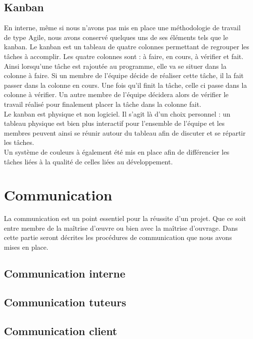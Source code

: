 \documentclass[asi]{picInsa}
\begin{document}
\subsection{Kanban}
En interne, même si nous n'avons pas mis en place une méthodologie de travail de type Agile, nous avons conservé quelques uns de ses éléments tels que le kanban. Le kanban est un tableau de quatre colonnes permettant de regrouper les tâches à accomplir. Les quatre colonnes sont : à faire, en cours, à vérifier et fait. Ainsi lorsqu'une tâche est rajoutée au programme, elle va se situer dans la colonne à faire. Si un membre de l'équipe décide de réaliser cette tâche, il la fait passer dans la colonne en cours. Une fois qu'il finit la tâche, celle ci passe dans la colonne à vérifier. Un autre membre de l'équipe décidera alors de vérifier le travail réalisé pour finalement placer la tâche dans la colonne fait.\\
Le kanban est physique et non logiciel. Il s'agit là d'un choix personnel : un tableau physique est bien plus interactif pour l'ensemble de l'équipe et les membres peuvent ainsi se réunir autour du tableau afin de discuter et se répartir les tâches.\\
Un système de couleurs à également été mis en place afin de différencier les tâches liées à la qualité de celles liées au développement.



\section{Communication}
La communication est un point essentiel pour la réussite d'un projet. Que ce soit entre membre de la maîtrise d’œuvre ou bien avec la maîtrise d'ouvrage. Dans cette partie seront décrites les procédures de communication que nous avons mises en place.

\subsection{Communication interne}


\subsection{Communication tuteurs}

\subsection{Communication client}





\begin{appendix}
\listoffigures
{}
	 
\listoftables
{}
\end{appendix}
\pageQuatriemeCouverture
\end{document}
